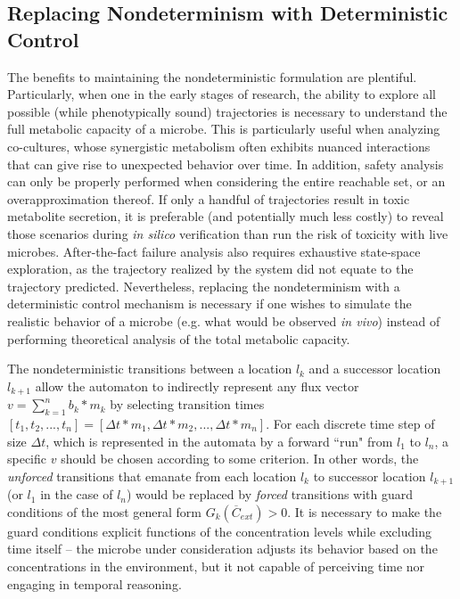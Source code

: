 \subsection{Replacing Nondeterminism with Deterministic Control}

The benefits to maintaining the nondeterministic formulation are plentiful. Particularly, when one in the early stages of research, the ability to explore all possible (while phenotypically sound) trajectories is necessary to understand the full metabolic capacity of a microbe. This is particularly useful when analyzing co-cultures, whose synergistic metabolism often exhibits nuanced interactions that can give rise to unexpected behavior over time. In addition, safety analysis can only be properly performed when considering the entire reachable set, or an overapproximation thereof. If only a handful of trajectories result in toxic metabolite secretion, it is preferable (and potentially much less costly) to reveal those scenarios during \textit{in silico} verification than run the risk of toxicity with live microbes. After-the-fact failure analysis also requires exhaustive state-space exploration, as the trajectory realized by the system did not equate to the trajectory predicted. Nevertheless, replacing the nondeterminism with a deterministic control mechanism is necessary if one wishes to simulate the realistic behavior of a microbe (e.g. what would be observed \textit{in vivo}) instead of performing theoretical analysis of the total metabolic capacity.

The nondeterministic transitions between a location $l_k$ and a successor location $l_{k+1}$ allow the automaton to indirectly represent any flux vector $v = \sum^{n}_{k=1} b_k * m_k$  by selecting transition times $[t_1, t_2, ..., t_n] = [\Delta t * m_1, \Delta t * m_2, ..., \Delta t * m_n ]$. %
For each discrete time step of size $\Delta t$, which is represented in the automata by a forward ``run" from $l_1$ to $l_n$, a specific $v$ should be chosen according to some criterion. In other words, the \textit{unforced} transitions that emanate from each location $l_k$ to successor location $l_{k+1}$ (or $l_1$ in the case of $l_n$) would be replaced by \textit{forced} transitions with guard conditions of the most general form $G_{k}(\overline{C}_{ext}) > 0$. It is necessary to make the guard conditions explicit functions of the concentration levels while excluding time itself -- the microbe under consideration adjusts its behavior based on the concentrations in the environment, but it not capable of perceiving time nor engaging in temporal reasoning.

